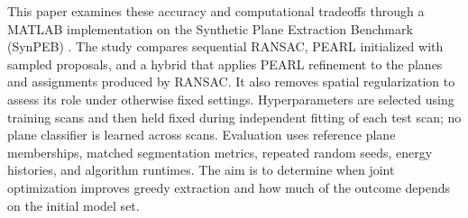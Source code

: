 This paper examines these accuracy and computational tradeoffs through a MATLAB implementation on the Synthetic Plane Extraction Benchmark (SynPEB) \cite{schaefer2019planes}. The study compares sequential RANSAC, PEARL initialized with sampled proposals, and a hybrid that applies PEARL refinement to the planes and assignments produced by RANSAC. It also removes spatial regularization to assess its role under otherwise fixed settings. Hyperparameters are selected using training scans and then held fixed during independent fitting of each test scan; no plane classifier is learned across scans. Evaluation uses reference plane memberships, matched segmentation metrics, repeated random seeds, energy histories, and algorithm runtimes. The aim is to determine when joint optimization improves greedy extraction and how much of the outcome depends on the initial model set.
